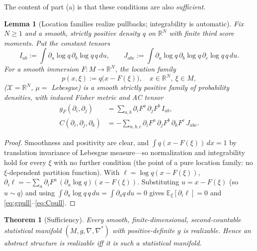 \documentclass{amsart}
\newtheorem{theorem}{Theorem}
\newtheorem{lemma}{Lemma}
\theoremstyle{definition}
\theoremstyle{remark}
\begin{document}
The content of part (a) is that these conditions are also \emph{sufficient}.

\begin{lemma}[Location families realize pullbacks; integrability is automatic]
\label{lem:location}
Fix $N\ge1$ and a smooth, strictly positive density $q$ on $\mathbb R^{N}$ with
finite third score moments. Put the constant tensors
\[
  I_{ab}:=\int\partial_{a}\log q\,\partial_{b}\log q\,q\,du,\qquad
  J_{abc}:=\int\partial_{a}\log q\,\partial_{b}\log q\,\partial_{c}\log q\,q\,du.
\]
For a smooth immersion $F\colon M\to\mathbb R^{N}$, the location family
\begin{equation}\label{eq:locfam}
  p(x,\xi):=q\bigl(x-F(\xi)\bigr),\quad x\in\mathbb R^{N},\ \xi\in M,
\end{equation}
($\mathcal X=\mathbb R^{N}$, $\mu=$ Lebesgue) is a smooth strictly positive
family of probability densities, with induced Fisher metric and AC tensor
\begin{align}
  g_{F}(\partial_{i},\partial_{j})
    &=\textstyle\sum_{a,b}\partial_{i}F^{a}\,\partial_{j}F^{b}\,I_{ab},
    \label{eq:gpull}\\
  C(\partial_{i},\partial_{j},\partial_{k})
    &=-\textstyle\sum_{a,b,c}\partial_{i}F^{a}\,\partial_{j}F^{b}\,
       \partial_{k}F^{c}\,J_{abc}.
    \label{eq:Cpull}
\end{align}
\end{lemma}

\begin{proof}
Smoothness and positivity are clear, and $\int q(x-F(\xi))\,dx=1$ by translation
invariance of Lebesgue measure---so normalization and integrability hold for
every $\xi$ with no further condition (the point of a pure location family: no
$\xi$-dependent partition function). With $\ell=\log q(x-F(\xi))$,
$\partial_{i}\ell=-\sum_{a}\partial_{i}F^{a}\,(\partial_{a}\log q)(x-F(\xi))$.
Substituting $u=x-F(\xi)$ (so $u\sim q$) and using
$\int\partial_{a}\log q\,q\,du=\int\partial_{a}q\,du=0$ gives
$\mathbb E_{\xi}[\partial_{i}\ell]=0$ and \eqref{eq:gpull}--\eqref{eq:Cpull}.
\end{proof}

\begin{theorem}[Sufficiency]\label{thm:suff}
Every smooth, finite-dimensional, second-countable statistical manifold
$(M,g,\nabla,\nabla^{*})$ with positive-definite $g$ is realizable. Hence an
abstract structure is realizable iff it is such a statistical manifold.
\end{theorem}
\end{document}
